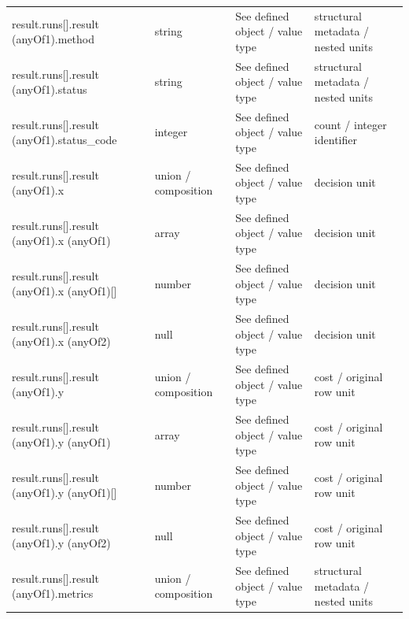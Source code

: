 \begin{longtable}{@{}>{\raggedright\arraybackslash}p{}>{\raggedright\arraybackslash}p{}>{\raggedright\arraybackslash}p{}>{\raggedright\arraybackslash}p{}@{}}
result.\allowbreak{}runs[].\allowbreak{}result (anyOf1).\allowbreak{}method & string & See defined object /\allowbreak{} value type & structural metadata /\allowbreak{} nested units\\
result.\allowbreak{}runs[].\allowbreak{}result (anyOf1).\allowbreak{}status & string & See defined object /\allowbreak{} value type & structural metadata /\allowbreak{} nested units\\
result.\allowbreak{}runs[].\allowbreak{}result (anyOf1).\allowbreak{}status\_\allowbreak{}code & integer & See defined object /\allowbreak{} value type & count /\allowbreak{} integer identifier\\
result.\allowbreak{}runs[].\allowbreak{}result (anyOf1).\allowbreak{}x & union /\allowbreak{} composition & See defined object /\allowbreak{} value type & decision unit\\
result.\allowbreak{}runs[].\allowbreak{}result (anyOf1).\allowbreak{}x (anyOf1) & array & See defined object /\allowbreak{} value type & decision unit\\
result.\allowbreak{}runs[].\allowbreak{}result (anyOf1).\allowbreak{}x (anyOf1)[] & number & See defined object /\allowbreak{} value type & decision unit\\
result.\allowbreak{}runs[].\allowbreak{}result (anyOf1).\allowbreak{}x (anyOf2) & null & See defined object /\allowbreak{} value type & decision unit\\
result.\allowbreak{}runs[].\allowbreak{}result (anyOf1).\allowbreak{}y & union /\allowbreak{} composition & See defined object /\allowbreak{} value type & cost /\allowbreak{} original row unit\\
result.\allowbreak{}runs[].\allowbreak{}result (anyOf1).\allowbreak{}y (anyOf1) & array & See defined object /\allowbreak{} value type & cost /\allowbreak{} original row unit\\
result.\allowbreak{}runs[].\allowbreak{}result (anyOf1).\allowbreak{}y (anyOf1)[] & number & See defined object /\allowbreak{} value type & cost /\allowbreak{} original row unit\\
result.\allowbreak{}runs[].\allowbreak{}result (anyOf1).\allowbreak{}y (anyOf2) & null & See defined object /\allowbreak{} value type & cost /\allowbreak{} original row unit\\
result.\allowbreak{}runs[].\allowbreak{}result (anyOf1).\allowbreak{}metrics & union /\allowbreak{} composition & See defined object /\allowbreak{} value type & structural metadata /\allowbreak{} nested units\\

\end{longtable}
